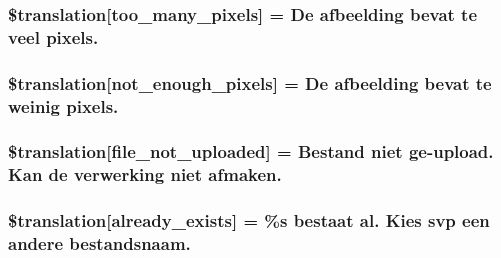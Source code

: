 \subsubsection[{\$translation}]{\setlength{\rightskip}{0pt plus 5cm}\$translation\mbox{[}\textquotesingle{}too\+\_\+many\+\_\+pixels\textquotesingle{}\mbox{]} = \textquotesingle{}De afbeelding bevat te veel pixels.\textquotesingle{}}\label{class_8upload_8nl___n_l_8php_aa4051ef64e94a3f8295c63cf85544016}
\hypertarget{class_8upload_8nl___n_l_8php_a1fe342c27ce61f4ff4e0120ba647033e}{}
\subsubsection[{\$translation}]{\setlength{\rightskip}{0pt plus 5cm}\$translation\mbox{[}\textquotesingle{}not\+\_\+enough\+\_\+pixels\textquotesingle{}\mbox{]} = \textquotesingle{}De afbeelding bevat te weinig pixels.\textquotesingle{}}\label{class_8upload_8nl___n_l_8php_a1fe342c27ce61f4ff4e0120ba647033e}
\hypertarget{class_8upload_8nl___n_l_8php_a4ce76e7be0b3a03c2b47f6d70c21832e}{}
\subsubsection[{\$translation}]{\setlength{\rightskip}{0pt plus 5cm}\$translation\mbox{[}\textquotesingle{}file\+\_\+not\+\_\+uploaded\textquotesingle{}\mbox{]} = \textquotesingle{}Bestand niet ge-\/upload. Kan de verwerking niet afmaken.\textquotesingle{}}\label{class_8upload_8nl___n_l_8php_a4ce76e7be0b3a03c2b47f6d70c21832e}
\hypertarget{class_8upload_8nl___n_l_8php_afd84e910217f04139f567c41e292afa5}{}
\subsubsection[{\$translation}]{\setlength{\rightskip}{0pt plus 5cm}\$translation\mbox{[}\textquotesingle{}already\+\_\+exists\textquotesingle{}\mbox{]} = \textquotesingle{}\%s bestaat al. Kies svp een andere bestandsnaam.\textquotesingle{}}\label{class_8upload_8nl___n_l_8php_afd84e910217f04139f567c41e292afa5}
\hypertarget{class_8upload_8nl___n_l_8php_ab0fa87a88aba2624004581eed0633325}{}
